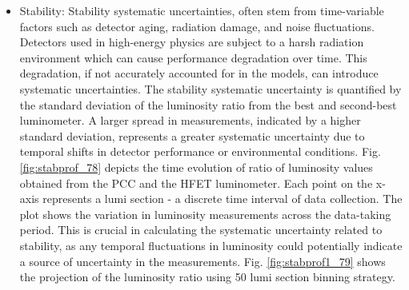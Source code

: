 \begin{itemize}
  
\item Stability: Stability systematic uncertainties, often stem from time-variable factors such as detector aging, radiation damage, and noise fluctuations. Detectors used in high-energy physics are subject to a harsh radiation environment which can cause performance degradation over time. This degradation, if not accurately accounted for in the models, can introduce systematic uncertainties. %
  The stability systematic uncertainty is quantified by the standard deviation of the luminosity ratio from the best and second-best luminometer. A larger spread in measurements, indicated by a higher standard deviation, represents a greater systematic uncertainty due to temporal shifts in detector performance or environmental conditions. Fig. \ref{fig:stabprof_78} depicts the time evolution of ratio of luminosity values obtained from the PCC and the HFET luminometer. Each point on the x-axis represents a lumi section - a discrete time interval of data collection. The plot shows the variation in luminosity measurements across the data-taking period. This is crucial in calculating the systematic uncertainty related to stability, as any temporal fluctuations in luminosity could potentially indicate a source of uncertainty in the measurements. %
Fig. \ref{fig:stabprof1_79} shows the projection of the luminosity ratio using 50 lumi section binning strategy. %

  

\end{itemize}
